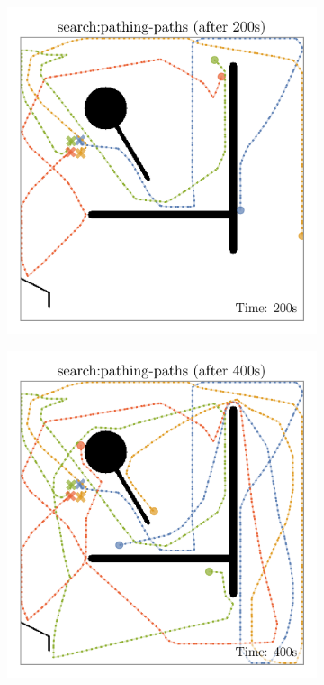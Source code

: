 \def\w{0.329\textwidth}
\begin{figure}[H]
    \centering
    \begin{subfigure}[b]{\w}
        \centering
        \includegraphics[width=\textwidth]{./figures/plots/paths/search:pathing-paths-(after-200s).png}
    \end{subfigure}
    \begin{subfigure}[b]{\w}
        \centering
        \includegraphics[width=\textwidth]{./figures/plots/paths/search:pathing-paths-(after-400s).png}

\end{subfigure}
\end{figure}
